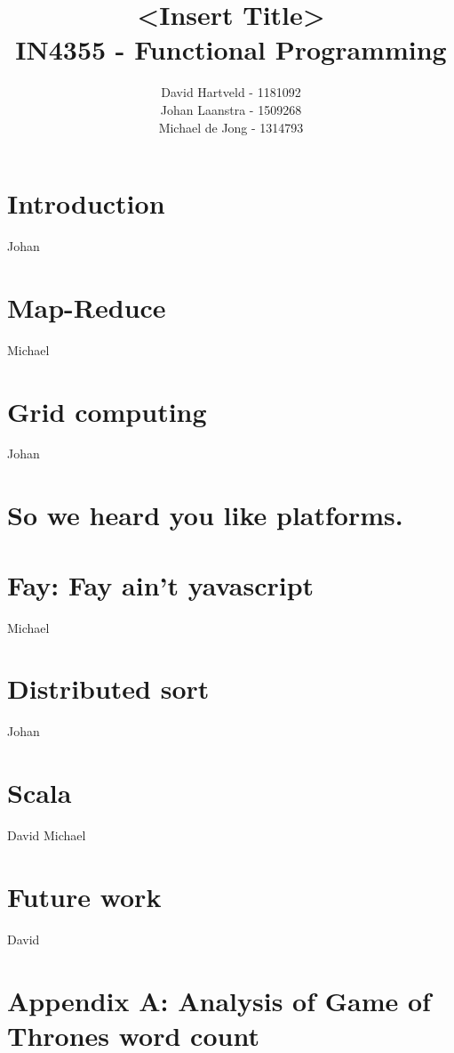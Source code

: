 \documentclass{article}
\title{<Insert Title>\\
IN4355 - Functional Programming}
\author{David Hartveld - 1181092 \\
		Johan Laanstra - 1509268 \\
		Michael de Jong - 1314793}
\begin{document}
\maketitle
\pagebreak
\section{Introduction}
	
	Johan
		
\section{Map-Reduce}
	
	Michael
	
\section{Grid computing}
	
	Johan
	
\section{So we heard you like platforms.}
	
	
\section{Fay: Fay ain't yavascript}
	
	Michael
	
\section{Distributed sort}
	
	Johan
	
\section{Scala}
	
	David
	Michael
	
\section{Future work}
	
	David
	


	
\pagebreak


\section{Appendix A: Analysis of Game of Thrones word count}
	
\end{document}
